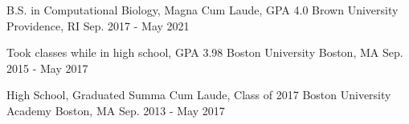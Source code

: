 

\begin{cventries}

  \vspace{-1mm}
  \cventry
    {B.S. in Computational Biology, Magna Cum Laude, GPA 4.0} %
    {Brown University} %
    {Providence, RI} %
    {Sep. 2017 - May 2021} %
    {}
  
  \vspace{-4mm}  
  \cventry
    {Took classes while in high school, GPA 3.98} %
    {Boston University} %
    {Boston, MA} %
    {Sep. 2015 - May 2017} %
    {}
   
  \vspace{-4mm}    
  \cventry
    {High School, Graduated Summa Cum Laude, Class of 2017} %
    {Boston University Academy} %
    {Boston, MA} %
    {Sep. 2013 - May 2017} %
    {}
    
\end{cventries}
